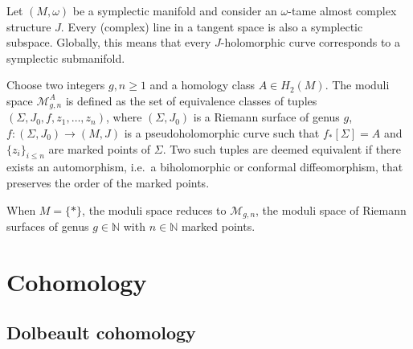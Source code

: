     \begin{property}
        Let $(M,\omega)$ be a symplectic manifold and consider an $\omega$-tame almost complex structure $J$. Every (complex) line in a tangent space is also a symplectic subspace. Globally, this means that every $J$-holomorphic curve corresponds to a symplectic submanifold.
    \end{property}


    \begin{construct}
        Choose two integers $g,n\geq1$ and a homology class $A\in H_2(M)$. The moduli space $\mathcal{M}^A_{g,n}$ is defined as the set of equivalence classes of tuples $(\Sigma,J_0,f,z_1,\ldots,z_n)$, where $(\Sigma,J_0)$ is a Riemann surface of genus $g$, $f:(\Sigma,J_0)\rightarrow(M,J)$ is a pseudoholomorphic curve such that $f_*[\Sigma]=A$ and $\{z_i\}_{i\leq n}$ are marked points of $\Sigma$. Two such tuples are deemed equivalent if there exists an automorphism, i.e.~a biholomorphic or conformal diffeomorphism, that preserves the order of the marked points.
    \end{construct}
    \begin{example}
        When $M=\{\ast\}$, the moduli space reduces to $\mathcal{M}_{g,n}$, the moduli space of Riemann surfaces of genus $g\in\mathbb{N}$ with $n\in\mathbb{N}$ marked points.
    \end{example}

\section{Cohomology}
\subsection{Dolbeault cohomology}

